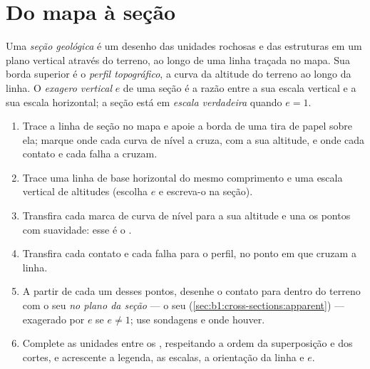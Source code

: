 \section{Do mapa à seção}

\begin{definition}\label{def:b1:cross-sections:section}
Uma \emph{seção geológica} é um desenho das unidades rochosas e das estruturas em um plano vertical através do terreno, ao longo de uma linha traçada no mapa. Sua borda superior é o \emph{perfil topográfico}, a curva da altitude do terreno ao longo da linha. O \emph{exagero vertical} $e$ de uma seção é a razão entre a sua escala vertical e a sua escala horizontal; a seção está em \emph{escala verdadeira} quando $e = 1$.
\end{definition}

\begin{method}\label{met:b1:cross-sections:construct}
\begin{enumerate}
  \item Trace a linha de seção no mapa e apoie a borda de uma tira de papel sobre ela; marque onde cada curva de nível a cruza, com a sua altitude, e onde cada contato e cada falha a cruzam.
  \item Trace uma linha de base horizontal do mesmo comprimento e uma escala vertical de altitudes (escolha $e$ e escreva-o na seção).
  \item Transfira cada marca de curva de nível para a sua altitude e una os pontos com suavidade: esse é o .
  \item Transfira cada contato e cada falha para o perfil, no ponto em que cruzam a linha.
  \item A partir de cada um desses pontos, desenhe o contato para dentro do terreno com o seu  \emph{no plano da seção} --- o seu  (\cref{sec:b1:cross-sections:apparent}) --- exagerado por $e$ se $e \ne 1$; use sondagens e  onde houver.
  \item Complete as unidades entre os , respeitando a ordem da superposição e dos cortes, e acrescente a legenda, as escalas, a orientação da linha e $e$.
\end{enumerate}
\end{method}

